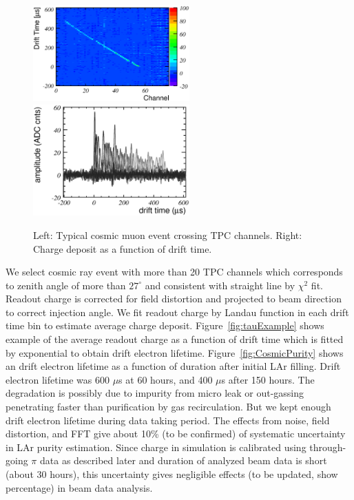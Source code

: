 \begin{figure}[htbp]
 \begin{center}
  \includegraphics[width=60mm]{fig/cosmic68_ev258_display.eps}
  \includegraphics[width=60mm]{fig/cosmic68_ev258.eps}
 \end{center}
 \caption{Left: Typical cosmic muon event crossing TPC channels. Right: Charge deposit as a function of drift time.}
 \label{fig:CosmicEvent}
\end{figure}

We select cosmic ray event with more than 20 TPC channels which corresponds to zenith angle of more than $27^\circ$ and consistent with straight line by $\chi^2$ fit. 
Readout charge is corrected for field distortion and projected to beam direction to correct injection angle.
We fit readout charge by Landau function in each drift time bin to estimate average charge deposit. 
Figure~\ref{fig:tauExample} shows example of the average readout charge as a function of drift time which is fitted by exponential to obtain drift electron lifetime. 
Figure~\ref{fig:CosmicPurity} shows an drift electron lifetime as a function of duration after initial LAr filling.
Drift electron lifetime was 600 $\mu$s at 60 hours, and 400 $\mu$s after 150 hours.
The degradation is possibly due to impurity from micro leak or out-gassing penetrating faster than purification by gas recirculation.
But we kept enough drift electron lifetime during data taking period.
The effects from noise, field distortion, and FFT give about 10\% (to be confirmed) of systematic uncertainty in LAr purity estimation.
Since charge in simulation is calibrated using through-going $\pi$ data as described later and duration of analyzed beam data is short (about 30 hours), this uncertainty gives negligible effects (to be updated, show percentage) in beam data analysis. 

